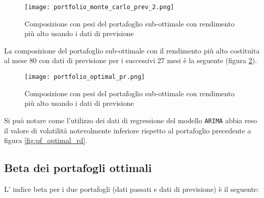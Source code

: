 \begin{figure}[p]
    \centering
    \texttt{[image: portfolio\_monte\_carlo\_prev\_2.png]}
    \caption{Composizione con pesi del portafoglio sub-ottimale con rendimento più alto usando i dati di previsione}
    \label{fig:prev_monte_carlo_2}
\end{figure}

\pagebreak

La composizione del portafoglio sub-ottimale con il rendimento più alto costituita al mese 80 con dati di previsione per
i successivi 27 mesi è la seguente (figura \ref{fig:pf_optimal_pr}).

\begin{figure}[ht]
    \centering
    \texttt{[image: portfolio\_optimal\_pr.png]}
    \caption{Composizione con pesi del portafoglio sub-ottimale con rendimento più alto usando i dati di previsione}
    \label{fig:pf_optimal_pr}
\end{figure}

Si può notare come l'utilizzo dei dati di regressione del modello \verb|ARIMA| abbia reso il valore di volatilità
notevolmente inferiore rispetto al portafoglio precedente a figura \ref{fig:pf_optimal_rd}.

\subsection{Beta dei portafogli ottimali}

L' indice beta per i due portafogli (dati passati e dati di previsione) è il seguente:

